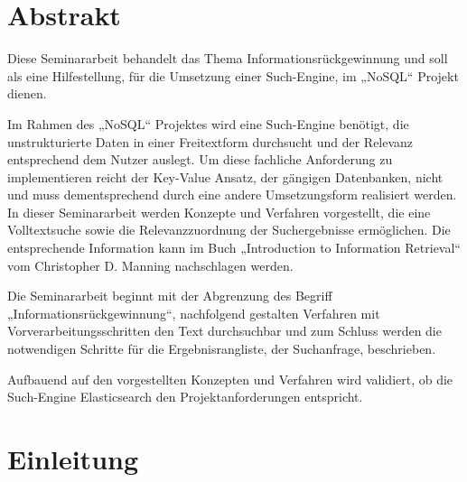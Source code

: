 \section[Abstrakt ]{Abstrakt }



Diese Seminararbeit behandelt das Thema Informationsrückgewinnung und
soll als eine Hilfestellung, für die Umsetzung einer Such-Engine, im
„NoSQL“ Projekt dienen. 

Im Rahmen des „NoSQL“ Projektes wird eine Such-Engine benötigt, die
unstrukturierte Daten in einer Freitextform durchsucht und der Relevanz
entsprechend dem Nutzer auslegt. Um diese fachliche Anforderung zu
implementieren reicht der Key-Value Ansatz, der gängigen Datenbanken,
nicht und muss dementsprechend durch eine andere Umsetzungsform
realisiert werden. In dieser Seminararbeit werden Konzepte und
Verfahren vorgestellt, die eine Volltextsuche sowie die
Relevanzzuordnung der Suchergebnisse ermöglichen. Die entsprechende
Information kann im Buch „Introduction to Information Retrieval“ vom
Christopher D. Manning nachschlagen werden.

Die Seminararbeit beginnt mit der Abgrenzung des Begriff
„Informationsrückgewinnung“, nachfolgend gestalten Verfahren mit
Vorverarbeitungsschritten den Text durchsuchbar und zum Schluss werden
die notwendigen Schritte für die Ergebnisrangliste, der Suchanfrage,
beschrieben. 

Aufbauend auf den vorgestellten Konzepten und Verfahren wird validiert,
ob die Such-Engine {\textquotedbl}Elasticsearch{\textquotedbl} den
Projektanforderungen entspricht.




\section[Einleitung]{Einleitung}



